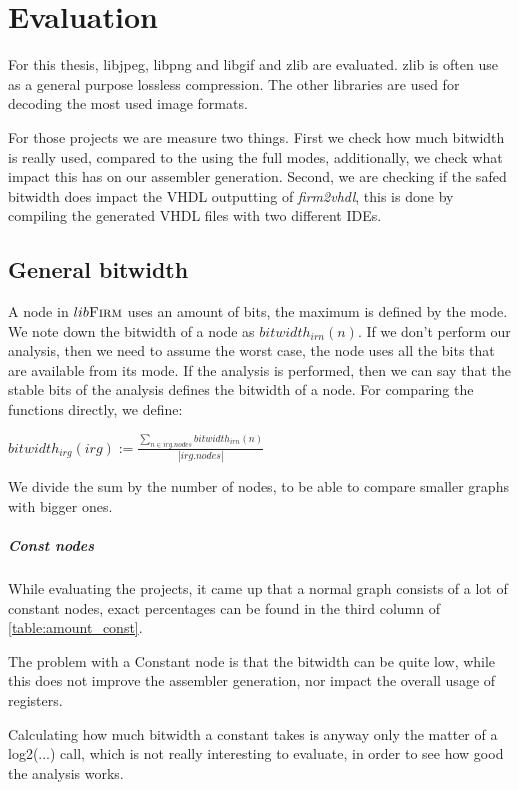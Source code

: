 \chapter{Evaluation}\label{sec:eval}

For this thesis, libjpeg, libpng and libgif and zlib are evaluated. zlib is often use as a general purpose lossless compression. The other libraries are used for decoding the most used image formats.

For those projects we are measure two things. 
First we check how much bitwidth is really used, compared to the using the full modes, additionally, we check what impact this has on our assembler generation.
Second, we are checking if the safed bitwidth does impact the VHDL outputting of \textit{firm2vhdl}, this is done by compiling the generated VHDL files with two different IDEs.

\section{General bitwidth}
A node in $lib\textsc{Firm}$ uses an amount of bits, the maximum is defined by the mode. We note down the bitwidth of a node as $bitwidth_{irn}(n)$.
If we don't perform our analysis, then we need to assume the worst case, the node uses all the bits that are available from its mode.
If the analysis is performed, then we can say that the stable bits of the analysis defines the bitwidth of a node.
For comparing the functions directly, we define:

$bitwidth_{irg}(irg) := \frac{\sum\nolimits_{n \in irg.nodes} bitwidth_{irn}(n)}{|irg.nodes|} $ 

We divide the sum by the number of nodes, to be able to compare smaller graphs with bigger ones. 

\paragraph{Const nodes}

While evaluating the projects, it came up that a normal graph consists of a lot of constant nodes, exact percentages can be found in the third column of  \autoref{table:amount_const}. 

The problem with a Constant node is that the bitwidth can be quite low, while this does not improve the assembler generation, nor impact the overall usage of registers.

Calculating how much bitwidth a constant takes is anyway only the matter of a log2(...) call, which is not really interesting to evaluate, in order to see how good the analysis works.

